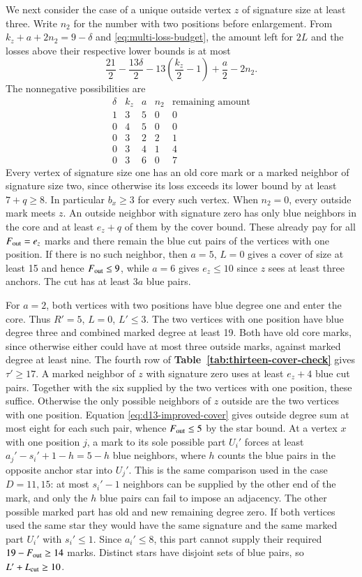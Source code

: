 We next consider the case of a unique outside vertex $z$ of signature
size at least three. Write $n_2$ for the number with two positions
before enlargement. From $k_z+a+2n_2=9-\delta$ and
\eqref{eq:multi-loss-budget}, the amount left for $2L$ and the
losses above their respective lower bounds is at most
\[
 \frac{21}{2}-\frac{13\delta}{2}
 -13\left(\frac{k_z}{2}-1\right)+\frac{a}{2}-2n_2 .
\]
The nonnegative possibilities are
\[
\begin{array}{rrrrr}
 \delta& k_z&a&n_2&\text{remaining amount}\\
 1&3&5&0&0\\
 0&4&5&0&0\\
 0&3&2&2&1\\
 0&3&4&1&4\\
 0&3&6&0&7
\end{array}
\]
Every vertex of signature size one has an old core mark or a marked
neighbor of signature size two, since otherwise its loss exceeds its
lower bound by at least $7+q\ge8$. In particular $b_x\ge3$ for
every such vertex. When $n_2=0$, every outside mark meets $z$.
An outside neighbor with signature zero has only blue neighbors in
the core and at least $e_z+q$ of them by the cover bound. These
already pay for all $F_{\rm out}=e_z$ marks and there remain the
blue cut pairs of the vertices with one position. If there is
no such neighbor, then $a=5$, $L=0$ gives a cover of size at least
15 and hence $F_{\rm out}\le9$, while $a=6$ gives $e_z\le10$ since
$z$ sees at least three anchors. The cut has at least $3a$ blue pairs.

For $a=2$, both vertices with two positions have blue degree one
and enter the core. Thus $R'=5$, $L=0$, $L'\le3$. The two vertices
with one position have blue degree three and combined marked degree at
least 19. Both have old core marks, since otherwise either could have
at most three outside marks, against marked degree at least nine.
The fourth row of \textbf{Table~\ref{tab:thirteen-cover-check}} gives $\tau'\ge17$. A marked
neighbor of $z$ with signature zero uses at least $e_z+4$ blue
cut pairs. Together with the six supplied by the two vertices with
one position, these suffice. Otherwise the only possible neighbors
of $z$ outside are the two vertices with one position.
Equation \eqref{eq:d13-improved-cover} gives outside degree sum at
most eight for each such pair, whence $F_{\rm out}\le5$ by the star
bound. At a vertex $x$ with one position $j$, a mark to its sole
possible part $U_i'$ forces at least
$a_j'-s_i'+1-h=5-h$ blue neighbors, where $h$ counts the blue pairs
in the opposite anchor star into $U_j'$. This is the same comparison
used in the case $D=11,15$: at most $s_i'-1$ neighbors can be
supplied by the other end of the mark, and only the $h$ blue
pairs can fail to impose an adjacency. The other possible marked
part has old and new remaining degree zero. If both vertices used
the same star they would have the same signature and the same marked
part $U_i'$ with $s_i'\le1$. Since $a_i'\le8$, this part cannot
supply their required $19-F_{\rm out}\ge14$ marks. Distinct stars
have disjoint sets of blue pairs, so $L'+L_{\rm cut}\ge10$.

